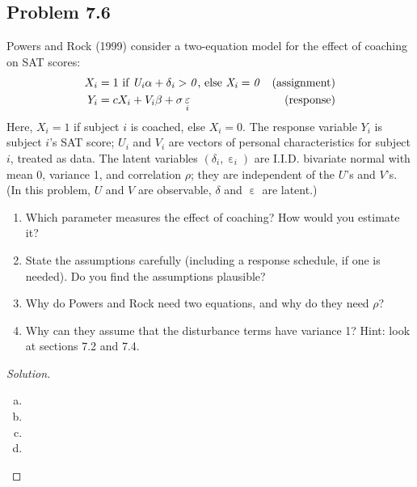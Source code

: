 \documentclass{amsart}
\DeclareMathOperator{\ep}{\varepsilon}
\begin{document}
		\subsection{Problem 7.6} %
		\label{sub:problem_7_6}
			Powers and Rock (1999) consider a two-equation model for the effect of coaching on SAT scores:
				\begin{align*}
					X_{i} &= 1 \text{ if } \it U_{i}\alpha + \delta_{i} > 0\text{, else }X_{i} = 0 & \rm (assignment) \\
					Y_{i} &= cX_{i} + V_{i}\beta + \sigma \ep_{i} & \rm (response)
				\end{align*}
			Here, $X_{i} = 1$ if subject $i$ is coached, else $X_{i} = 0$. 
			The response variable $Y_{i}$ is subject $i$'s SAT score; $U_{i}$ and $V_{i}$ are vectors of personal characteristics for subject $i$, treated as data. 
			The latent variables $(\delta_{i}, \ep_{i})$ are I.I.D. bivariate normal with mean 0, variance 1, and correlation $\rho$; they are independent of the $U$'s and $V$'s. 
			(In this problem, $U$ and $V$ are observable, $\delta$ and $\ep$ are latent.)
			\begin{enumerate}
				\item Which parameter measures the effect of coaching? 
				How would you estimate it?
				\item State the assumptions carefully (including a response schedule, if one is needed). 
				Do you find the assumptions plausible?
				\item Why do Powers and Rock need two equations, and why do they need $\rho$?
				\item Why can they assume that the disturbance terms have variance 1? 
				Hint: look at sections 7.2 and 7.4.
			\end{enumerate}
		\begin{proof}[Solution] \
			\begin{enumerate}[(a)]
				\item
				\item 
				\item 
				\item 
			\end{enumerate}
		\end{proof}
\end{document}
